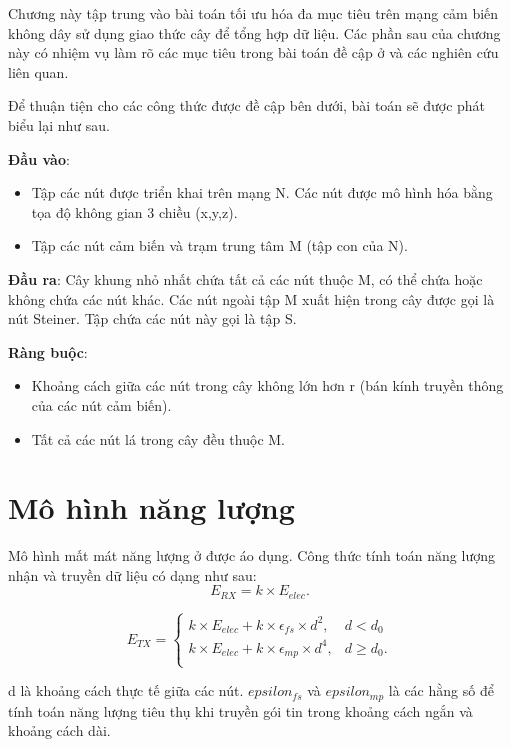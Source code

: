 Chương này tập trung vào bài toán tối ưu hóa đa mục tiêu trên mạng cảm biến không dây sử dụng giao thức cây để tổng hợp dữ liệu. Các phần sau của chương này có nhiệm vụ làm rõ các mục tiêu trong bài toán đề cập ở \cite{lu2014construction} và các nghiên cứu liên quan.


Để thuận tiện cho các công thức được đề cập bên dưới, bài toán sẽ được phát biểu lại như sau.

\textbf{Đầu vào}: 
\begin{itemize}
	\item Tập các nút được triển khai trên mạng N. Các nút được mô hình hóa bằng tọa độ không gian 3 chiều (x,y,z).
	\item Tập các nút cảm biến và trạm trung tâm M (tập con của N).
\end{itemize}

\textbf{Đầu ra}: Cây khung nhỏ nhất chứa tất cả các nút thuộc M, có thể chứa hoặc không chứa các nút khác. Các nút ngoài tập M xuất hiện trong cây được gọi là nút Steiner. Tập chứa các nút này gọi là tập S.

\textbf{Ràng buộc}:
\begin{itemize}
	\item Khoảng cách giữa các nút trong cây không lớn hơn r (bán kính truyền thông của các nút cảm biến).
	\item Tất cả các nút lá trong cây đều thuộc M.
\end{itemize}

\section{Mô hình năng lượng}
Mô hình mất mát năng lượng ở \cite{heinzelman2002application} được áo dụng. Công thức tính toán năng lượng nhận và truyền dữ liệu có dạng như sau:
\begin{equation}
E_{RX} = k \times E_{elec}.
\end{equation}

\begin{equation}
E_{TX} = 
\begin{cases}
k \times E_{elec} + k \times \epsilon_{fs} \times d^2,  & d < d_0\\
k \times E_{elec} + k \times \epsilon_{mp} \times d^4, & d \geq d_0.\\
\end{cases}
\end{equation}

d là khoảng cách thực tế giữa các nút. $epsilon_{fs}$ và $epsilon_{mp}$ là các hằng số để tính toán năng lượng tiêu thụ khi truyền gói tin trong khoảng cách ngắn và khoảng cách dài.

